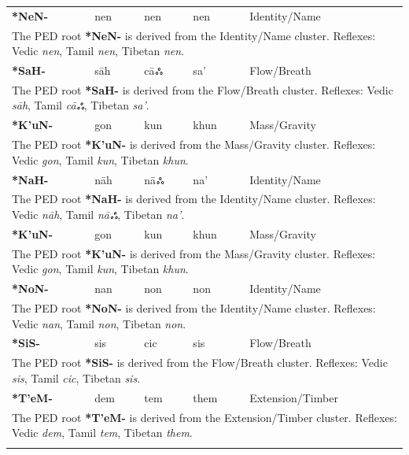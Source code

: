 \begin{longtable}{p{} p{} p{} p{} p{}}
\textbf{*NeN-} & nen & nen & nen & Identity/Name \\ 
\multicolumn{5}{p{\textwidth}}{\small The PED root \textbf{*NeN-} is derived from the Identity/Name cluster. Reflexes: Vedic \textit{nen}, Tamil \textit{nen}, Tibetan \textit{nen}. } \\ \addlinespace 
\textbf{*SaH-} & sāh & cāஃ & sa' & Flow/Breath \\ 
\multicolumn{5}{p{\textwidth}}{\small The PED root \textbf{*SaH-} is derived from the Flow/Breath cluster. Reflexes: Vedic \textit{sāh}, Tamil \textit{cāஃ}, Tibetan \textit{sa'}. } \\ \addlinespace 
\textbf{*K'uN-} & gon & kun & khun & Mass/Gravity \\ 
\multicolumn{5}{p{\textwidth}}{\small The PED root \textbf{*K'uN-} is derived from the Mass/Gravity cluster. Reflexes: Vedic \textit{gon}, Tamil \textit{kun}, Tibetan \textit{khun}. } \\ \addlinespace 
\textbf{*NaH-} & nāh & nāஃ & na' & Identity/Name \\ 
\multicolumn{5}{p{\textwidth}}{\small The PED root \textbf{*NaH-} is derived from the Identity/Name cluster. Reflexes: Vedic \textit{nāh}, Tamil \textit{nāஃ}, Tibetan \textit{na'}. } \\ \addlinespace 
\textbf{*K'uN-} & gon & kun & khun & Mass/Gravity \\ 
\multicolumn{5}{p{\textwidth}}{\small The PED root \textbf{*K'uN-} is derived from the Mass/Gravity cluster. Reflexes: Vedic \textit{gon}, Tamil \textit{kun}, Tibetan \textit{khun}. } \\ \addlinespace 
\textbf{*NoN-} & nan & non & non & Identity/Name \\ 
\multicolumn{5}{p{\textwidth}}{\small The PED root \textbf{*NoN-} is derived from the Identity/Name cluster. Reflexes: Vedic \textit{nan}, Tamil \textit{non}, Tibetan \textit{non}. } \\ \addlinespace 
\textbf{*SiS-} & sis & cic & sis & Flow/Breath \\ 
\multicolumn{5}{p{\textwidth}}{\small The PED root \textbf{*SiS-} is derived from the Flow/Breath cluster. Reflexes: Vedic \textit{sis}, Tamil \textit{cic}, Tibetan \textit{sis}. } \\ \addlinespace 
\textbf{*T'eM-} & dem & tem & them & Extension/Timber \\ 
\multicolumn{5}{p{\textwidth}}{\small The PED root \textbf{*T'eM-} is derived from the Extension/Timber cluster. Reflexes: Vedic \textit{dem}, Tamil \textit{tem}, Tibetan \textit{them}. } \\ \addlinespace 

\end{longtable}
